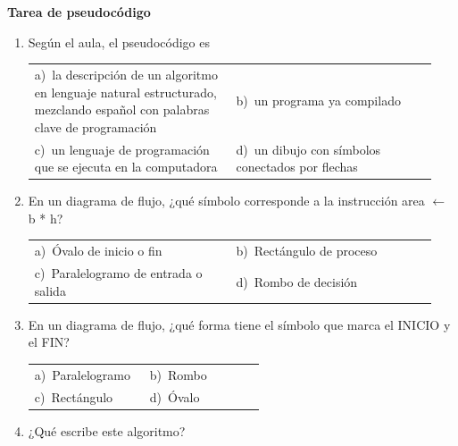 \documentclass[11pt,a4paper]{article}
\begin{document}
{\Large\bfseries Tarea de pseudocódigo}
\vspace{12pt}
\begin{enumerate}[label=\textbf{\arabic*.},leftmargin=*,itemsep=11pt,topsep=0pt]
\item \begin{minipage}[t]{\linewidth}
Según el aula, el pseudocódigo es

\vspace{4pt}
\begin{tabular}{@{}p{0.47\linewidth}p{0.47\linewidth}@{}}
a)~la descripción de un algoritmo en lenguaje natural estructurado, mezclando español con palabras clave de programación & b)~un programa ya compilado \\
c)~un lenguaje de programación que se ejecuta en la computadora & d)~un dibujo con símbolos conectados por flechas \\
\end{tabular}
\end{minipage}

\item \begin{minipage}[t]{\linewidth}
En un diagrama de flujo, ¿qué símbolo corresponde a la instrucción area $\leftarrow$ b * h?

\vspace{4pt}
\begin{tabular}{@{}p{0.47\linewidth}p{0.47\linewidth}@{}}
a)~Óvalo de inicio o fin & b)~Rectángulo de proceso \\
c)~Paralelogramo de entrada o salida & d)~Rombo de decisión \\
\end{tabular}
\end{minipage}

\item \begin{minipage}[t]{\linewidth}
En un diagrama de flujo, ¿qué forma tiene el símbolo que marca el INICIO y el FIN?

\vspace{4pt}
\begin{tabular}{@{}p{0.47\linewidth}p{0.47\linewidth}@{}}
a)~Paralelogramo & b)~Rombo \\
c)~Rectángulo & d)~Óvalo \\
\end{tabular}
\end{minipage}

\item \begin{minipage}[t]{\linewidth}
¿Qué escribe este algoritmo?


\end{minipage}
\end{enumerate}
\end{document}
